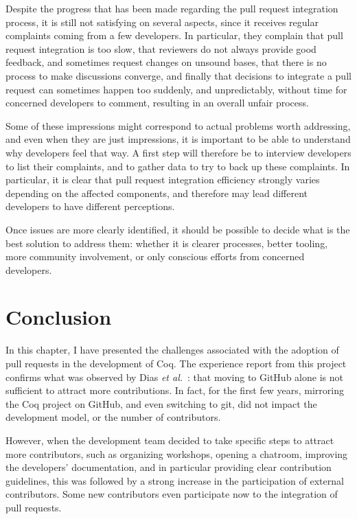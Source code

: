 Despite the progress that has been made regarding the pull request integration process, it is still not satisfying on several aspects, since it receives regular complaints coming from a few developers.
In particular, they complain that pull request integration is too slow, that reviewers do not always provide good feedback, and sometimes request changes on unsound bases, that there is no process to make discussions converge, and finally that decisions to integrate a pull request can sometimes happen too suddenly, and unpredictably, without time for concerned developers to comment, resulting in an overall unfair process.

Some of these impressions might correspond to actual problems worth addressing, and even when they are just impressions, it is important to be able to understand why developers feel that way.
A first step will therefore be to interview developers to list their complaints, and to gather data to try to back up these complaints.
In particular, it is clear that pull request integration efficiency strongly varies depending on the affected components, and therefore may lead different developers to have different perceptions.

Once issues are more clearly identified, it should be possible to decide what is the best solution to address them: whether it is clearer processes, better tooling, more community involvement, or only conscious efforts from concerned developers.

\section{Conclusion}

In this chapter, I have presented the challenges associated with the adoption of pull requests in the development of Coq.
The experience report from this project confirms what was observed by Dias \emph{et al.}~\cite{dias2016does}: that moving to GitHub alone is not sufficient to attract more contributions.
In fact, for the first few years, mirroring the Coq project on GitHub, and even switching to git, did not impact the development model, or the number of contributors.

However, when the development team decided to take specific steps to attract more contributors, such as organizing workshops, opening a chatroom, improving the developers' documentation, and in particular providing clear contribution guidelines, this was followed by a strong increase in the participation of external contributors.
Some new contributors even participate now to the integration of pull requests.

